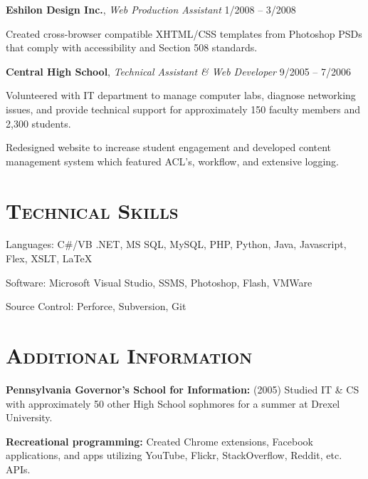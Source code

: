 \documentclass[12pt,a4paper,draft]{article}
\newcommand{\sectionhead}{\normalfont\normalsize\scshape}
\newcommand{\li}{\item[--]}
\newcommand{\workhead}[3]{\textbf{#1}, \emph{#2} \hfill #3}
\begin{document}
\begin{description}[leftmargin=1em]
    \item
        \workhead{Eshilon Design Inc.}{Web Production Assistant}{1/2008 -- 3/2008}
        \begin{itemize*}
            \li Created cross-browser compatible XHTML/CSS templates from Photoshop PSDs that comply with accessibility and Section 508 standards.
        \end{itemize*}

    \item
        \workhead{Central High School}{Technical Assistant \& Web Developer}{9/2005 -- 7/2006}
        \begin{itemize*}
            \li Volunteered with IT department to manage computer labs, diagnose networking issues, and provide technical support for approximately 150 faculty members and 2,300 students.
            \li Redesigned website to increase student engagement and developed content management system which featured ACL's, workflow, and extensive logging.
        \end{itemize*}

\end{description}

\section*{\sectionhead Technical Skills}
\begin{description*}
    \item Languages: C\#/VB .NET, MS SQL, MySQL, PHP, Python, Java, Javascript, Flex, XSLT, \LaTeX
    \item Software: Microsoft Visual Studio, SSMS, Photoshop, Flash, VMWare
    \item Source Control: Perforce, Subversion, Git
\end{description*}

\section*{\sectionhead Additional Information}
\begin{itemize*}
    \item \textbf{Pennsylvania Governor's School for Information:} (2005) Studied IT \& CS with approximately 50 other High School sophmores for a summer at Drexel University.
    \item \textbf{Recreational programming:} Created Chrome extensions, Facebook applications, and apps utilizing YouTube, Flickr, StackOverflow, Reddit, etc. APIs.
\end{itemize*}
\end{document}
